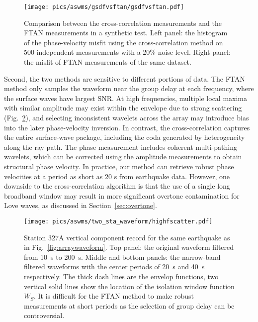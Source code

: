 \begin{figure}
	\center
	\texttt{[image: pics/aswms/gsdfvsftan/gsdfvsftan.pdf]}
	\caption{Comparison between the cross-correlation measurements and the FTAN measurements in a synthetic test. Left panel: the histogram of the phase-velocity misfit using the cross-correlation method on 500 independent measurements with a 20\% noise level. Right panel: the misfit of FTAN measurements of the same dataset.}
	\label{fig:syntest}
\end{figure}


Second, the two methods are sensitive to different portions of data. The FTAN method only samples the waveform near the group delay at each frequency, where the surface waves have largest SNR. At high frequencies, multiple local maxima with similar amplitude may exist within the envelope due to strong scattering (Fig.~\ref{fig:highfscatter}), and selecting inconsistent wavelets across the array may introduce bias into the later phase-velocity inversion. In contrast, the cross-correlation captures the entire surface-wave package, including the coda generated by heterogeneity along the ray path. The phase measurement includes coherent multi-pathing wavelets, which can be corrected using the amplitude measurements to obtain structural phase velocity. In practice, our method can retrieve robust phase velocities at a period as short as 20 s from earthquake data. However, one downside to the cross-correlation algorithm is that the use of a single long broadband window may result in more significant overtone contamination for Love waves, as discussed in Section~\ref{sec:overtone}. 

\begin{figure}
	\center
	\texttt{[image: pics/aswms/two\_sta\_waveform/highfscatter.pdf]}
	\caption{Station 327A vertical component record for the same earthquake as in Fig.~\ref{fig:arraywaveform}. Top panel: the original waveform filtered from 10~s to 200~s. Middle and bottom panels: the narrow-band filtered waveforms with the center periods of 20~s and 40~s respectively. The thick dash lines are the envelop functions, two vertical solid lines show the location of the isolation window function $W_S$. It is difficult for the FTAN method to make robust measurements at short periods as the selection of group delay can be controversial.}
	\label{fig:highfscatter}
\end{figure}

